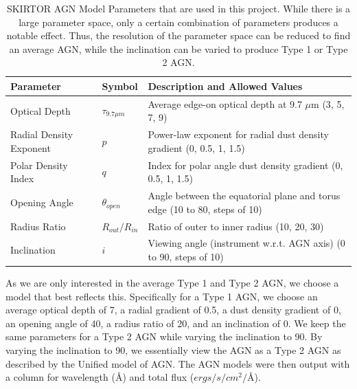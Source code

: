 \begin{table}[h!]
  \centering
  \begin{tabular}{llp{5.5cm}} %
    \hline
    \textbf{Parameter} & \textbf{Symbol} & \textbf{Description and Allowed Values} \\ \hline
    Optical Depth & $\tau_{9.7\mu m}$ & Average edge-on optical depth at 9.7 $\mu$m (3, 5, 7, 9) \\
    Radial Density Exponent & $p$ & Power-law exponent for radial dust density gradient (0, 0.5, 1, 1.5) \\
    Polar Density Index & $q$ & Index for polar angle dust density gradient (0, 0.5, 1, 1.5) \\
    Opening Angle & $\theta_{open}$ & Angle between the equatorial plane and torus edge (10 to 80, steps of 10) \\
    Radius Ratio & $R_{out}/R_{in}$ & Ratio of outer to inner radius (10, 20, 30) \\
    Inclination & $i$ & Viewing angle (instrument w.r.t. AGN axis) (0 to 90, steps of 10) \\
    \hline
  \end{tabular}
  \caption{SKIRTOR AGN Model Parameters that are used in this project. While there is a large parameter space, only a certain combination of parameters produces a notable effect. Thus, the resolution of the parameter space can be reduced to find an average AGN, while the inclination can be varied to produce Type 1 or Type 2 AGN.}
  \label{tab:skirtor_parameters}
\end{table} As we are only interested in the average Type 1 and Type 2 AGN, we choose a model that best reflects this. Specifically for a Type 1 AGN, we choose an average optical depth of 7, a radial gradient of 0.5, a dust density gradient of 0, an opening angle of 40, a radius ratio of 20, and an inclination of 0. We keep the same parameters for a Type 2 AGN while varying the inclination to 90. By varying the inclination to 90, we essentially view the AGN as a Type 2 AGN as described by the Unified model of AGN. The AGN models were then output with a column for wavelength ({\AA}) and total flux ($ergs\slash s\slash cm^{2}\slash ${\AA}).
